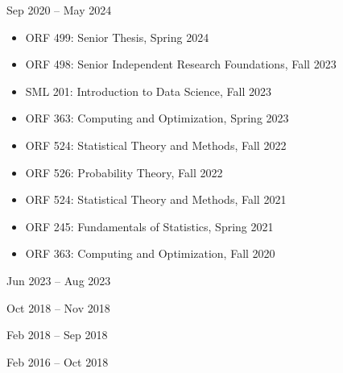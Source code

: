 \documentclass[
  date,
  number,
]{wgu-cv}
\begin{document}
\vspace*{-4mm}


{}
{Sep 2020 -- May 2024}

\begin{itemize}

  \item
    ORF 499:
    Senior Thesis,
    Spring 2024

  \item
    ORF 498:
    Senior Independent Research Foundations,
    Fall 2023

  \item
    SML 201:
    Introduction to Data Science,
    Fall 2023

  \item
    ORF 363:
    Computing and Optimization,
    Spring 2023

  \item
    ORF 524:
    Statistical Theory and Methods,
    Fall 2022

  \item
    ORF 526:
    Probability Theory,
    Fall 2022

  \item
    ORF 524:
    Statistical Theory and Methods,
    Fall 2021

  \item
    ORF 245:
    Fundamentals of Statistics,
    Spring 2021

  \item
    ORF 363:
    Computing and Optimization,
    Fall 2020

\end{itemize}

{}
{Jun 2023 -- Aug 2023}
\vspace*{2mm}

{}
{Oct 2018 -- Nov 2018}
\vspace*{2mm}

{}
{Feb 2018 -- Sep 2018}
\vspace*{2mm}

{}
{Feb 2016 -- Oct 2018}
\vspace*{2mm}
\end{document}
